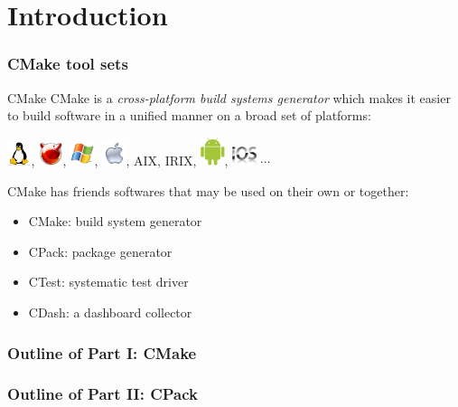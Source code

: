 \documentclass[compress,slidestop,table
              ]
               {beamer}
\begin{document}
\section{Introduction}
\begin{frame}[fragile]
\frametitle{CMake tool sets}

\begin{block}{CMake}
CMake is a \emph{cross-platform build systems generator} which makes it easier
to build software in a unified manner on a broad set of platforms:

\includegraphics[width=0.7cm]{TuxLogo_48},
\includegraphics[width=0.7cm]{FreeBSDLogo_48},
\includegraphics[width=0.7cm]{MSWindowsLogo_48},
\includegraphics[width=0.7cm]{AppleLogo_48},
AIX, IRIX,
\includegraphics[width=0.7cm]{AndroidLogo},
\includegraphics[width=0.7cm]{AppleIOSLogo_48}
$\cdots$
\end{block}
CMake has friends softwares that may be used on their own or together:
\begin{itemize}
\item CMake: build system generator
\item CPack: package generator
\item CTest: systematic test driver
\item CDash: a dashboard collector
\end{itemize}
\end{frame}

\begin{frame}
\frametitle{Outline of Part I: CMake}
\tableofcontents[part=1]
\end{frame}

\begin{frame}
\frametitle{Outline of Part II: CPack}
\tableofcontents[part=2]
\end{frame}
\end{document}
